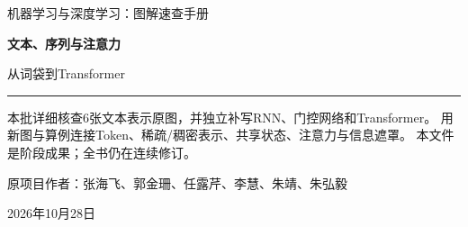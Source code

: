 \documentclass[a4paper,11pt,oneside,openany]{book}
\begin{document}
\frontmatter
\hypersetup{pageanchor=false}
\begin{titlepage}
\vspace*{16mm}
{\sffamily\color{Teal}\large 机器学习与深度学习：图解速查手册\par}
\vspace{15mm}
{\sffamily\bfseries\color{Ink}\Huge 文本、序列与注意力\par}
\vspace{6mm}
{\sffamily\color{Ink}\LARGE 从词袋到Transformer\par}
\vspace{12mm}
\noindent\textcolor{Teal}{\rule{\textwidth}{1.2pt}}
\vspace{7mm}
\begin{keyidea}[第十一批阶段样章]
本批详细核查6张文本表示原图，并独立补写RNN、门控网络和Transformer。
用新图与算例连接Token、稀疏/稠密表示、共享状态、注意力与信息遮罩。
本文件是阶段成果；全书仍在连续修订。
\end{keyidea}
\vfill
原项目作者：张海飞、郭金珊、任露芹、李慧、朱靖、朱弘毅\par
\vspace{4mm}
2026年10月28日\par
\end{titlepage}
\hypersetup{pageanchor=true}
\tableofcontents
\mainmatter
\setcounter{chapter}{10}


\end{document}
